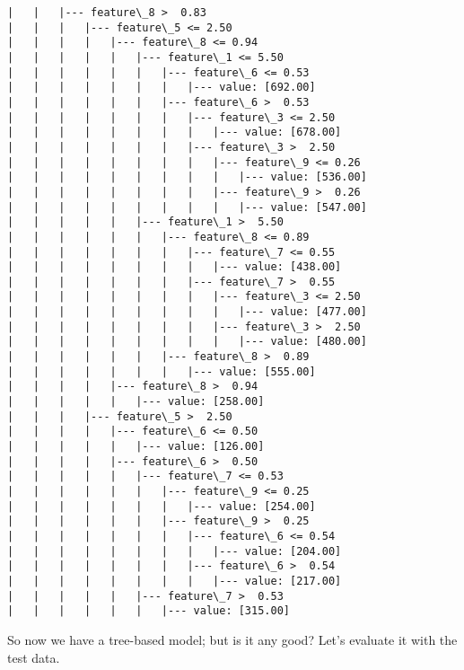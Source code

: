 \documentclass[11pt]{article}
\begin{document}
\begin{Verbatim}[commandchars=\\\{\}]
|   |   |--- feature\_8 >  0.83
|   |   |   |--- feature\_5 <= 2.50
|   |   |   |   |--- feature\_8 <= 0.94
|   |   |   |   |   |--- feature\_1 <= 5.50
|   |   |   |   |   |   |--- feature\_6 <= 0.53
|   |   |   |   |   |   |   |--- value: [692.00]
|   |   |   |   |   |   |--- feature\_6 >  0.53
|   |   |   |   |   |   |   |--- feature\_3 <= 2.50
|   |   |   |   |   |   |   |   |--- value: [678.00]
|   |   |   |   |   |   |   |--- feature\_3 >  2.50
|   |   |   |   |   |   |   |   |--- feature\_9 <= 0.26
|   |   |   |   |   |   |   |   |   |--- value: [536.00]
|   |   |   |   |   |   |   |   |--- feature\_9 >  0.26
|   |   |   |   |   |   |   |   |   |--- value: [547.00]
|   |   |   |   |   |--- feature\_1 >  5.50
|   |   |   |   |   |   |--- feature\_8 <= 0.89
|   |   |   |   |   |   |   |--- feature\_7 <= 0.55
|   |   |   |   |   |   |   |   |--- value: [438.00]
|   |   |   |   |   |   |   |--- feature\_7 >  0.55
|   |   |   |   |   |   |   |   |--- feature\_3 <= 2.50
|   |   |   |   |   |   |   |   |   |--- value: [477.00]
|   |   |   |   |   |   |   |   |--- feature\_3 >  2.50
|   |   |   |   |   |   |   |   |   |--- value: [480.00]
|   |   |   |   |   |   |--- feature\_8 >  0.89
|   |   |   |   |   |   |   |--- value: [555.00]
|   |   |   |   |--- feature\_8 >  0.94
|   |   |   |   |   |--- value: [258.00]
|   |   |   |--- feature\_5 >  2.50
|   |   |   |   |--- feature\_6 <= 0.50
|   |   |   |   |   |--- value: [126.00]
|   |   |   |   |--- feature\_6 >  0.50
|   |   |   |   |   |--- feature\_7 <= 0.53
|   |   |   |   |   |   |--- feature\_9 <= 0.25
|   |   |   |   |   |   |   |--- value: [254.00]
|   |   |   |   |   |   |--- feature\_9 >  0.25
|   |   |   |   |   |   |   |--- feature\_6 <= 0.54
|   |   |   |   |   |   |   |   |--- value: [204.00]
|   |   |   |   |   |   |   |--- feature\_6 >  0.54
|   |   |   |   |   |   |   |   |--- value: [217.00]
|   |   |   |   |   |--- feature\_7 >  0.53
|   |   |   |   |   |   |--- value: [315.00]

    \end{Verbatim}

    So now we have a tree-based model; but is it any good? Let's evaluate it
with the test data.
\end{document}
